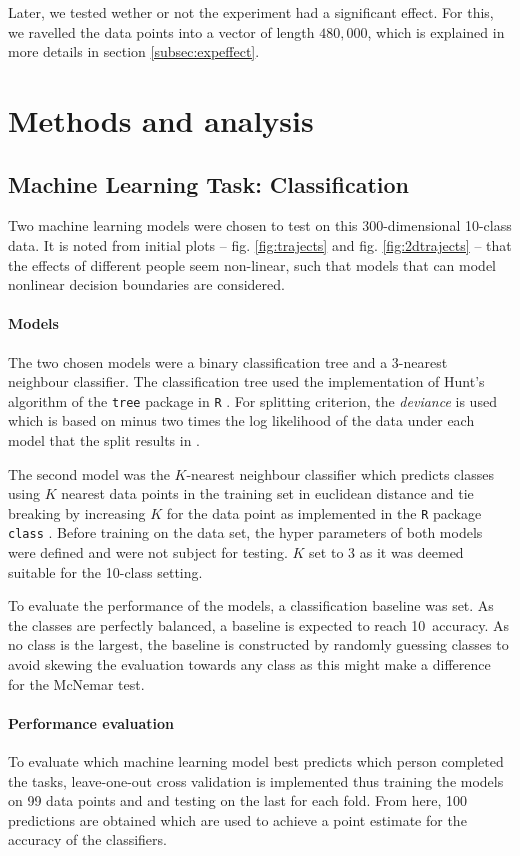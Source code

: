 \documentclass[11pt,fleqn]{article}
\begin{document}
Later, we tested wether or not the experiment had a significant effect.
For this, we ravelled the data points into a vector of length $ 480,000 $, which is explained in more details in section \ref{subsec:expeffect}.


\section{Methods and analysis}


\subsection{Machine Learning Task: Classification}
Two machine learning models were chosen to test on this 300-dimensional 10-class data.
It is noted from initial plots -- fig. \ref{fig:trajects} and fig. \ref{fig:2dtrajects} -- that the effects of different people seem non-linear, such that models that can model nonlinear decision boundaries are considered.
\paragraph{Models} The two chosen models were a binary classification tree and a 3-nearest neighbour classifier. The classification tree used the implementation of Hunt's algorithm of the \texttt{tree} package in \texttt{R} \cite{Tree}. For splitting criterion, the \textit{deviance} is used which is based on minus two times the log likelihood of the data under each model that the split results in \cite{Deviance}.

The second model was the \(K\)-nearest neighbour classifier which predicts classes using \(K\) nearest data points in the training set in euclidean distance and tie breaking by increasing \(K\) for the data point as implemented in the \texttt{R} package \texttt{class} \cite{KNN}. Before training on the data set, the hyper parameters of both models were defined and were not subject for testing. \(K\) set to 3 as it was deemed suitable for the 10-class setting.

To evaluate the performance of the models, a classification baseline was set. As the classes are perfectly balanced, a baseline is expected to reach 10\pro\ accuracy. As no class is the largest, the baseline is constructed by randomly guessing classes to avoid skewing the evaluation towards any class as this might make a difference for the McNemar test.
\paragraph{Performance evaluation}
To evaluate which machine learning model best predicts which person completed the tasks, leave-one-out cross validation is implemented thus training the models on 99 data points and and testing on the last for each fold.
From here, 100 predictions are obtained which are used to achieve a point estimate for the accuracy of the classifiers.
\end{document}
